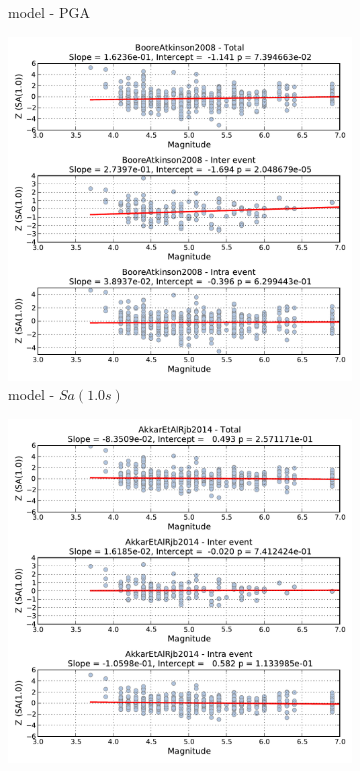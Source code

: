 \begin{figure}[htb]
\begin{subfigure}[b]{0.49\textwidth}
      \caption{\textcite{Akkar_etal2014} model - PGA}
      \label{fig:pga_mag_akkar2014}
  \end{subfigure}
    \begin{subfigure}[b]{0.49\textwidth}
      \includegraphics[width=\textwidth]{./figures/residuals/BA2008_Magnitude_Sa1.pdf}
      \caption{\textcite{boore2008} model - $Sa \left( {1.0 s} \right)$}
      \label{fig:sa1_mag_ba2008}
  \end{subfigure}
      \begin{subfigure}[b]{0.49\textwidth}
      \includegraphics[width=\textwidth]{./figures/residuals/Akkar2014_Magnitude_Sa1.pdf}

\end{subfigure}
\end{figure}
